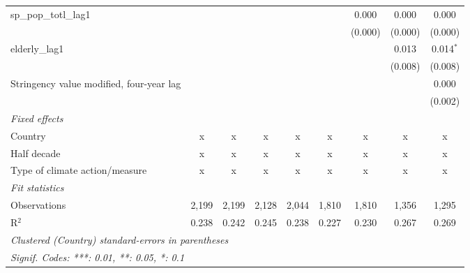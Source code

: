 \begin{tabular}{lcccccccc}
   sp\_pop\_totl\_lag1                             &               &               &               &               &         & 0.000   & 0.000       & 0.000\\   
                                                   &               &               &               &               &         & (0.000) & (0.000)     & (0.000)\\   
   elderly\_lag1                                   &               &               &               &               &         &         & 0.013       & 0.014$^{*}$\\   
                                                   &               &               &               &               &         &         & (0.008)     & (0.008)\\   
   Stringency value modified, four-year lag        &               &               &               &               &         &         &             & 0.000\\   
                                                   &               &               &               &               &         &         &             & (0.002)\\   
   \emph{Fixed effects}\\
   Country                                         & x             & x             & x             & x             & x       & x       & x           & x\\  
   Half decade                                     & x             & x             & x             & x             & x       & x       & x           & x\\  
   Type of climate action/measure                  & x             & x             & x             & x             & x       & x       & x           & x\\  
   \midrule \emph{Fit statistics}\\
   Observations                                    & 2,199         & 2,199         & 2,128         & 2,044         & 1,810   & 1,810   & 1,356       & 1,295\\  
   R$^2$                                           & 0.238         & 0.242         & 0.245         & 0.238         & 0.227   & 0.230   & 0.267       & 0.269\\  
   \midrule
   \multicolumn{9}{l}{\emph{Clustered (Country) standard-errors in parentheses}}\\
   \multicolumn{9}{l}{\emph{Signif. Codes: ***: 0.01, **: 0.05, *: 0.1}}\\
\end{tabular}
\par\endgroup


